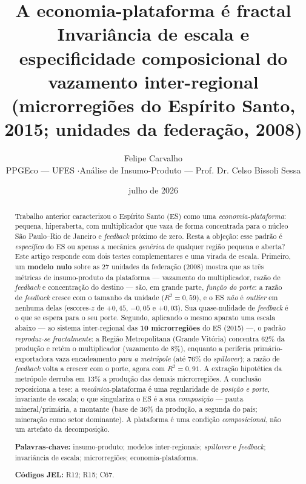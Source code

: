\documentclass[11pt,a4paper]{article}
\title{\textbf{A economia-plataforma é fractal}\\[2pt]
\large Invariância de escala e especificidade composicional do vazamento
inter-regional \\ (microrregiões do Espírito Santo, 2015; unidades da
federação, 2008)}
\author{Felipe Carvalho\\
\small PPGEco --- UFES \quad$\cdot$\quad Análise de Insumo-Produto --- Prof. Dr. Celso Bissoli Sessa}
\date{julho de 2026}
\begin{document}
\maketitle
\thispagestyle{empty}

\begin{abstract}
\noindent
Trabalho anterior caracterizou o Espírito Santo (ES) como uma
\emph{economia-plataforma}: pequena, hiperaberta, com multiplicador que vaza de
forma concentrada para o núcleo São Paulo--Rio de Janeiro e \emph{feedback}
próximo de zero. Resta a objeção: esse padrão é \emph{específico} do ES ou
apenas a mecânica \emph{genérica} de qualquer região pequena e aberta? Este
artigo responde com dois testes complementares e uma virada de escala. Primeiro,
um \textbf{modelo nulo} sobre as 27 unidades da federação (2008) mostra que as
três métricas de insumo-produto da plataforma --- vazamento do multiplicador,
razão de \emph{feedback} e concentração do destino --- são, em grande parte,
\emph{função do porte}: a razão de \emph{feedback} cresce com o tamanho da
unidade ($R^2=0{,}59$), e o ES \emph{não} é \emph{outlier} em nenhuma delas
(escores-$z$ de $+0{,}45$, $-0{,}05$ e $+0{,}03$). Sua quase-nulidade de
\emph{feedback} é o que se espera para o seu porte. Segundo, aplicando o mesmo
aparato uma escala abaixo --- ao sistema inter-regional das \textbf{10
microrregiões} do ES (2015) ---, o padrão \emph{reproduz-se fractalmente}: a
Região Metropolitana (Grande Vitória) concentra 62\% da produção e retém o
multiplicador (vazamento de 8\%), enquanto a periferia primário-exportadora
vaza encadeamento \emph{para a metrópole} (até 76\% do \emph{spillover}); a
razão de \emph{feedback} volta a crescer com o porte, agora com $R^2=0{,}91$. A
extração hipotética da metrópole derruba em 13\% a produção das demais
microrregiões. A conclusão reposiciona a tese: a \emph{mecânica}-plataforma é
uma regularidade de \emph{posição e porte}, invariante de escala; o que
singulariza o ES é a sua \emph{composição} --- pauta mineral/primária, a
montante (base de 36\% da produção, a segunda do país; mineração como setor
dominante). A plataforma é uma condição \emph{composicional}, não um artefato da
decomposição.

\vspace{0.6em}
\noindent\textbf{Palavras-chave:} insumo-produto; modelos inter-regionais;
\emph{spillover} e \emph{feedback}; invariância de escala; microrregiões;
economia-plataforma.

\noindent\textbf{Códigos JEL:} R12; R15; C67.
\end{abstract}
\end{document}
